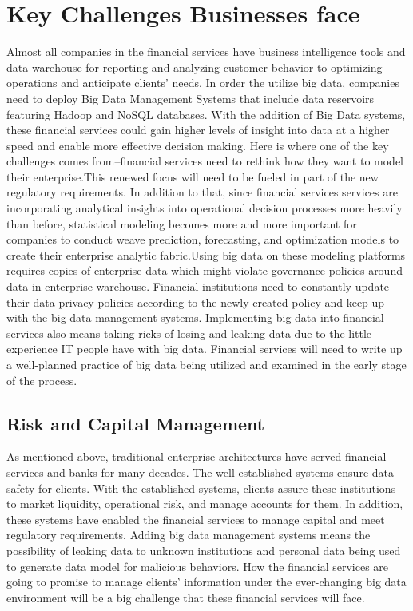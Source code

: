\documentclass[sigconf]{acmart}
\begin{document}
\section{Key Challenges Businesses face}
Almost all companies in the financial services have business intelligence tools and data warehouse for reporting and analyzing customer behavior to optimizing operations and anticipate clients' needs. In order the utilize big data, companies need to deploy Big Data Management Systems that include data reservoirs featuring Hadoop and NoSQL databases.\cite{Stackowiak2015} With the addition of Big Data systems, these financial services could gain higher levels of insight into data
at a higher speed and enable more effective decision making. Here is where one of the key challenges comes from--financial services need to rethink how they want to model their enterprise.\cite{Stackowiak2015}This renewed focus will need to be fueled in part of the new regulatory requirements. In addition to that, since financial services services are incorporating analytical insights into operational decision processes more heavily than before, statistical modeling becomes more and more important for companies to conduct weave prediction, forecasting, and optimization models to create their enterprise analytic fabric.\cite{Stackowiak2015}Using big data on these modeling platforms requires copies of enterprise data which might violate governance policies around data in enterprise warehouse. Financial institutions need to constantly update their data privacy policies according to the newly created policy and keep up with the big data management systems.
Implementing big data into financial services also means taking ricks of losing and leaking data due to the little experience IT people have with big data. Financial services will need to write up a well-planned practice of big data being utilized and examined in the early stage of the process.\cite{Turner2013} 

\subsection{Risk and Capital Management}
As mentioned above, traditional enterprise architectures have served financial services and banks for many decades. The well established systems ensure data safety for clients. With the established systems, clients assure these institutions to market liquidity, operational risk, and manage accounts for them. In addition, these systems have enabled the financial services to manage  capital and meet regulatory requirements.\cite{Turner2013} Adding big data management systems means the possibility of leaking data to unknown institutions and personal data being used to generate data model for malicious behaviors. How the financial services are going to promise to manage clients' information under the ever-changing big data environment will be a big challenge that these financial services will face.\cite{Turner2013}
\end{document}
